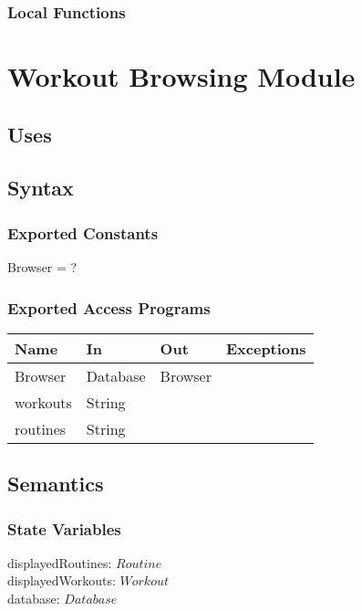 \documentclass[12pt, titlepage]{article}
\begin{document}
\subsubsection{Local Functions}


\newpage

\section{Workout Browsing Module}

\subsection{Uses}

\subsection{Syntax}

\subsubsection{Exported Constants}
Browser = ?
\subsubsection{Exported Access Programs}

\begin{center}
	\begin{tabular}{p{2cm} p{4cm} p{4cm} p{2cm}}
		\hline
		\textbf{Name} & \textbf{In} & \textbf{Out} & \textbf{Exceptions} \\
		\hline
		Browser & Database & Browser &  \\
		workouts & String &  &  \\
		routines & String &  &  \\
		\hline
	\end{tabular}
\end{center}

\subsection{Semantics}

\subsubsection{State Variables}

displayedRoutines: $Routine$ \\
displayedWorkouts: $Workout$ \\
database: $Database$ \\
\end{document}
